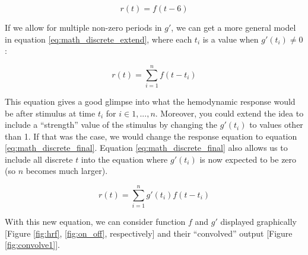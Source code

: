 \begin{equation}  \label{eq:math_discrete}
r(t)=  f(t-6)
\end{equation}



If we allow for multiple non-zero periods in $g'$, we can get a more general 
model in equation \ref{eq:math_discrete_extend}, where each $t_i$ is a value 
when $g'(t_i) \neq 0$: 

\begin{equation}  \label{eq:math_discrete_extend}
r(t)= \sum_{i=1}^n f(t-t_i)
\end{equation}

This equation gives a good glimpse into what the hemodynamic response would be 
after stimulus at time $t_i$ for $i \in {1,...,n}$. Moreover, you could extend 
the idea to include a ``strength'' value of the stimulus by changing the 
$g'(t_i)$ to values other than 1. If that was the case, we would change 
the response equation to equation \ref{eq:math_discrete_final}. Equation 
\ref{eq:math_discrete_final} also allows us to include all discrete $t$ into 
the equation where $g'(t_i)$ is now expected to be zero (so $n$ becomes much 
larger). 

\begin{equation}  \label{eq:math_discrete_final}
r(t)= \sum_{i=1}^n g'(t_i) f(t-t_i)
\end{equation}


With this new equation, we can consider function $f$ and $g'$ displayed 
graphically [Figure \ref{fig:hrf}, \ref{fig:on_off}, respectively] and 
their ``convolved'' output [Figure \ref{fig:convolve1}].




